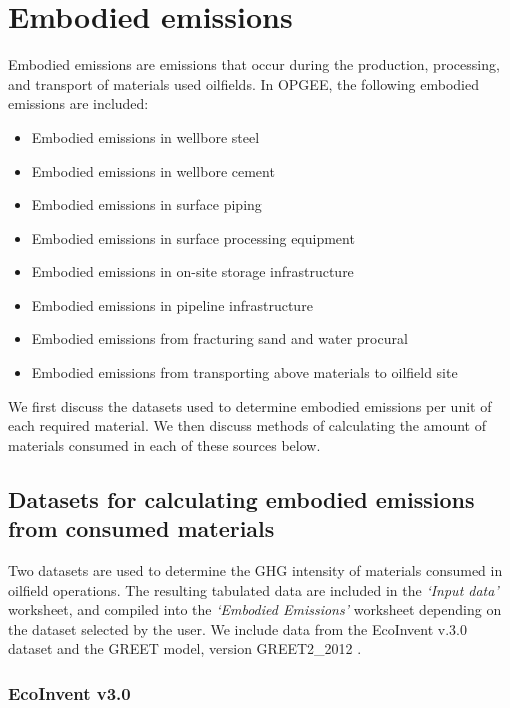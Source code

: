 \documentclass[11pt]{report}
\newcommand{\sheet}[1]{\textit{`{#1}'}}
\begin{document}
\section{Embodied emissions} \label{sec:embodied_emissions}

Embodied emissions are emissions that occur during the production, processing, and transport of materials used oilfields. In OPGEE, the following embodied emissions are included:
\begin{itemize}
\item Embodied emissions in wellbore steel
\item Embodied emissions in wellbore cement
\item Embodied emissions in surface piping
\item Embodied emissions in surface processing equipment
\item Embodied emissions in on-site storage infrastructure
\item Embodied emissions in pipeline infrastructure
\item Embodied emissions from fracturing sand and water procural
\item Embodied emissions from transporting above materials to oilfield site
\end{itemize}

We first discuss the datasets used to determine embodied emissions per unit of each required material. We then discuss methods of calculating the amount of materials consumed in each of these sources below. 

\subsection{Datasets for calculating embodied emissions from consumed materials}

Two datasets are used to determine the GHG intensity of materials consumed in oilfield operations. The resulting tabulated data are included in the \sheet{Input data} worksheet, and compiled into the \sheet{Embodied Emissions} worksheet depending on the dataset  selected by the user. We include data from the EcoInvent v.3.0 dataset \cite{ecoinvent2014} and the GREET model, version GREET2\_2012 \cite{wang2012}.

\subsubsection{EcoInvent v3.0}
\end{document}
